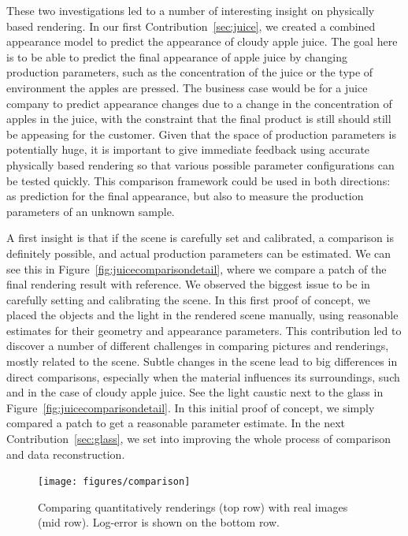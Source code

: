 These two investigations led to a number of interesting insight on physically based rendering. In our first Contribution~\ref{sec:juice}, we created a combined appearance model to predict the appearance of cloudy apple juice. The goal here is to be able to predict the final appearance of apple juice by changing production parameters, such as the concentration of the juice or the type of environment the apples are pressed. The business case would be for a juice company to predict appearance changes due to a change in the concentration of apples in the juice, with the constraint that the final product is still should still be appeasing for the customer. Given that the space of production parameters is potentially huge, it is important to give immediate feedback using accurate physically based rendering so that various possible parameter configurations can be tested quickly. This comparison framework could be used in both directions: as prediction for the final appearance, but also to measure the production parameters of an unknown sample. 

A first insight is that if the scene is carefully set and calibrated, a comparison is definitely possible, and actual production parameters can be estimated. We can see this in Figure~\ref{fig:juicecomparisondetail}, where we compare a patch of the final rendering result with reference. We observed the biggest issue to be in carefully setting and calibrating the scene. In this first proof of concept, we placed the objects and the light in the rendered scene manually, using reasonable estimates for their geometry and appearance parameters. This contribution led to discover a number of different challenges in comparing pictures and renderings, mostly related to the scene. Subtle changes in the scene lead to big differences in direct comparisons, especially when the material influences its surroundings, such and in the case of cloudy apple juice. See the light caustic next to the glass in Figure~\ref{fig:juicecomparisondetail}. In this initial proof of concept, we simply compared a patch to get a reasonable parameter estimate. In the next Contribution~\ref{sec:glass}, we set into improving the whole process of comparison and data reconstruction.

\begin{figure}
\centering
 \texttt{[image: figures/comparison]} 
\caption{Comparing quantitatively renderings (top row) with real images (mid row). Log-error is shown on the bottom row.}
\label{fig:glasscomparison}
\end{figure}

